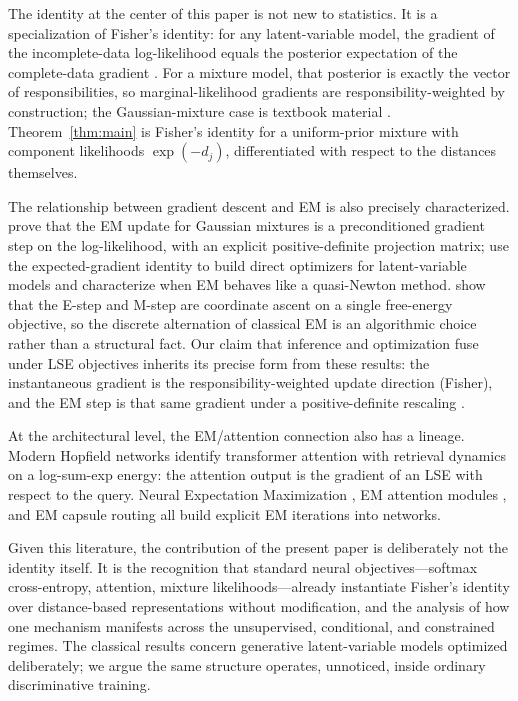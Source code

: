 The identity at the center of this paper is not new to statistics. It is a specialization of Fisher's identity: for any latent-variable model, the gradient of the incomplete-data log-likelihood equals the posterior expectation of the complete-data gradient \citep[see, e.g.,][]{cappe2009online}. For a mixture model, that posterior is exactly the vector of responsibilities, so marginal-likelihood gradients are responsibility-weighted by construction; the Gaussian-mixture case is textbook material \citep[\S 9.2]{bishop2006pattern}. Theorem~\ref{thm:main} is Fisher's identity for a uniform-prior mixture with component likelihoods $\exp(-d_j)$, differentiated with respect to the distances themselves.

The relationship between gradient descent and EM is also precisely characterized. \citet{xu1996convergence} prove that the EM update for Gaussian mixtures is a preconditioned gradient step on the log-likelihood, with an explicit positive-definite projection matrix; \citet{salakhutdinov2003optimization} use the expected-gradient identity to build direct optimizers for latent-variable models and characterize when EM behaves like a quasi-Newton method. \citet{neal1998view} show that the E-step and M-step are coordinate ascent on a single free-energy objective, so the discrete alternation of classical EM is an algorithmic choice rather than a structural fact. Our claim that inference and optimization fuse under LSE objectives inherits its precise form from these results: the instantaneous gradient is the responsibility-weighted update direction (Fisher), and the EM step is that same gradient under a positive-definite rescaling \citep{xu1996convergence}.

At the architectural level, the EM/attention connection also has a lineage. Modern Hopfield networks \citep{ramsauer2020hopfield} identify transformer attention with retrieval dynamics on a log-sum-exp energy: the attention output is the gradient of an LSE with respect to the query. Neural Expectation Maximization \citep{greff2017neural}, EM attention modules \citep{li2019expectation}, and EM capsule routing \citep{hinton2018matrix} all build explicit EM iterations into networks.

Given this literature, the contribution of the present paper is deliberately not the identity itself. It is the recognition that standard neural objectives---softmax cross-entropy, attention, mixture likelihoods---already instantiate Fisher's identity over distance-based representations without modification, and the analysis of how one mechanism manifests across the unsupervised, conditional, and constrained regimes. The classical results concern generative latent-variable models optimized deliberately; we argue the same structure operates, unnoticed, inside ordinary discriminative training.

